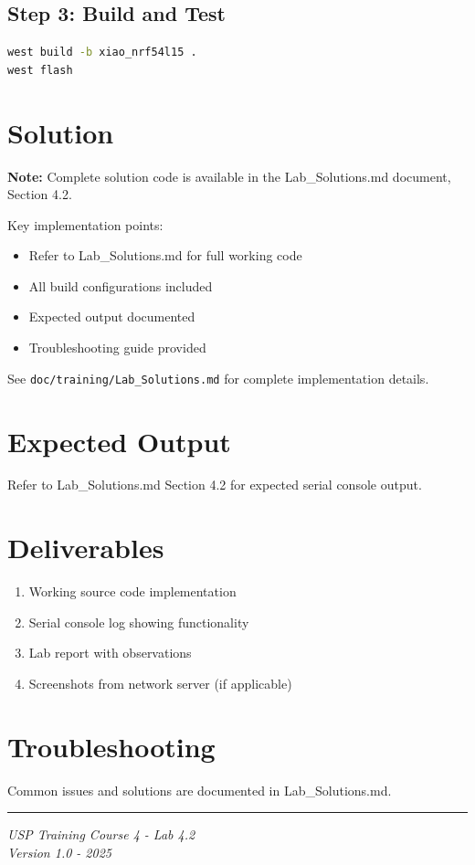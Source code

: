 \documentclass[11pt,a4paper]{article}
\begin{document}
\subsection{Step 3: Build and Test}
\begin{lstlisting}[language=bash]
west build -b xiao_nrf54l15 .
west flash
\end{lstlisting}

\section{Solution}

\begin{solutionbox}
\textbf{Note:} Complete solution code is available in the Lab\_Solutions.md document, Section 4.2.

Key implementation points:
\begin{itemize}
    \item Refer to Lab\_Solutions.md for full working code
    \item All build configurations included
    \item Expected output documented
    \item Troubleshooting guide provided
\end{itemize}

See \texttt{doc/training/Lab\_Solutions.md} for complete implementation details.
\end{solutionbox}

\section{Expected Output}

Refer to Lab\_Solutions.md Section 4.2 for expected serial console output.

\section{Deliverables}

\begin{enumerate}[itemsep=10pt]
    \item Working source code implementation
    \item Serial console log showing functionality
    \item Lab report with observations
    \item Screenshots from network server (if applicable)
\end{enumerate}

\section{Troubleshooting}

Common issues and solutions are documented in Lab\_Solutions.md.

\vfill
\noindent\rule{\textwidth}{0.4pt}
\begin{center}
\textit{USP Training Course 4 - Lab 4.2}\\
\textit{Version 1.0 - 2025}
\end{center}
\end{document}
